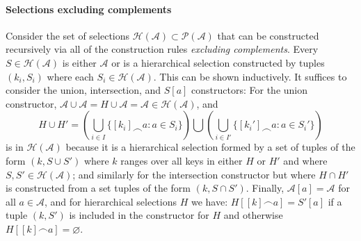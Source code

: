 \documentclass{article}
\begin{document}
\paragraph{Selections excluding complements}
Consider the set of selections $\mathcal{H}(\mathcal{A}) \subset \mathcal{P}(\mathcal{A})$ that can be constructed recursively via all of the construction rules \emph{excluding complements}.
Every $S \in \mathcal{H}(\mathcal{A})$ is either $\mathcal{A}$
or is a hierarchical selection constructed by tuples $(k_i, S_i)$ where each $S_i \in \mathcal{H}(\mathcal{A})$.
This can be shown inductively.
It suffices to consider the union, intersection, and $S[a]$ constructors:
For the union constructor, $\mathcal{A} \cup \mathcal{A} = H \cup \mathcal{A} = \mathcal{A} \in \mathcal{H}(\mathcal{A})$, and
\[
H \cup H' =
\left( \bigcup_{i \in I} \{[k_i] \frown a : a \in S_i\} \right)
\bigcup
\left( \bigcup_{i \in I'} \{[k_i'] \frown a : a \in S_i'\} \right)
\]
is in $\mathcal{H}(\mathcal{A})$ because it is a hierarchical selection formed by a set of tuples of the form
$(k, S \cup S')$ where $k$ ranges over all keys in either $H$ or $H'$ and where $S, S' \in \mathcal{H}(\mathcal{A})$;
and similarly for the intersection constructor but where $H \cap H'$ is constructed from a set tuples of the form $(k, S \cap S')$.
Finally, $\mathcal{A}[a] = \mathcal{A}$ for all $a \in \mathcal{A}$, and for hierarchical selections $H$ we have:
$H[[k] \frown a] = S'[a]$ if a tuple $(k, S')$ is included in the constructor for $H$ and otherwise $H[[k] \frown a] = \varnothing$.
\end{document}
